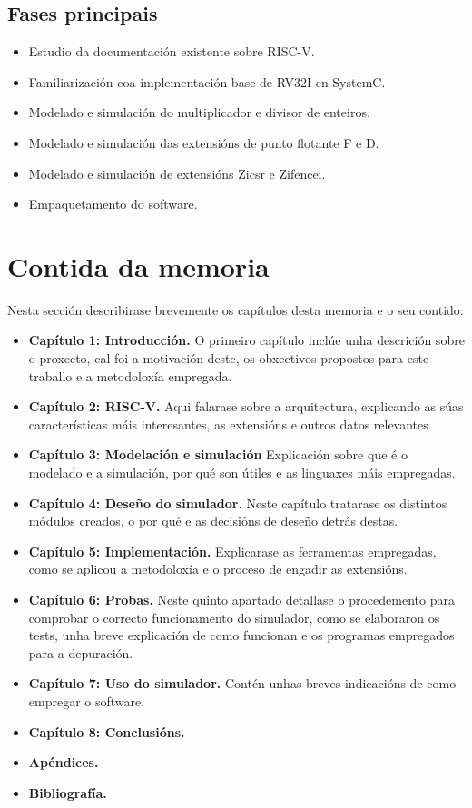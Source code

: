 \subsection{Fases principais}
\begin{itemize}
    \item Estudio da documentación existente sobre RISC-V.
    \item Familiarización coa implementación base de RV32I en SystemC. 
    \item Modelado e simulación do multiplicador e divisor de enteiros. 
    \item Modelado e simulación das extensións de punto flotante F e D. 
    \item Modelado e simulación de extensións Zicsr e  Zifencei.
    \item Empaquetamento do software. 

\end{itemize}

\section{Contida da memoria}
\label{sec:contido_memoria}
Nesta sección describirase brevemente os capítulos desta memoria e o seu contido: 
\begin{itemize}
    \item \textbf{Capítulo 1: Introducción.}  O primeiro capítulo inclúe unha descrición sobre o proxecto, cal foi a motivación deste, os obxectivos propostos para este traballo e a metodoloxía empregada.
    \item \textbf{Capítulo 2: RISC-V.} Aqui falarase sobre a arquitectura, explicando as súas características máis interesantes, as extensións e outros datos relevantes.
    \item \textbf{Capítulo 3: Modelación e simulación} Explicación sobre que é o modelado e a simulación, por qué son útiles e as linguaxes máis empregadas.
    \item \textbf{Capítulo 4: Deseño do simulador.} Neste capítulo tratarase os distintos módulos creados, o por qué e as decisións de deseño detrás destas.
    \item \textbf{Capítulo 5: Implementación.} Explicarase as ferramentas empregadas, como se aplicou a metodoloxía e o proceso de engadir as extensións.
    \item \textbf{Capítulo 6: Probas.} Neste quinto apartado detallase o procedemento para comprobar o correcto funcionamento do simulador, como se elaboraron os tests, unha breve explicación de como funcionan e os programas empregados para a depuración.
    \item \textbf{Capítulo 7: Uso do simulador.} Contén unhas breves indicacións de como empregar o software.
    \item \textbf{Capítulo 8: Conclusións.}
    \item \textbf{Apéndices. }
    \item \textbf{Bibliografía. }
    
\end{itemize}


